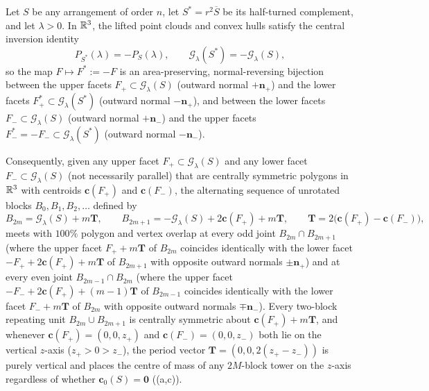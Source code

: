 \begin{theorem}
\label{thm:mirror-tower}
Let $S$ be any arrangement of order $n$, let $S^*=r^2\overline S$ be its half-turned complement, and let $\lambda>0$. In $\mathbb{R}^3$, the lifted point clouds and convex hulls satisfy the central inversion identity
\begin{equation}
\label{eq:central-inv}
P_{S^*}(\lambda) = -P_S(\lambda),\qquad
\mathcal G_\lambda(S^*) = -\mathcal G_\lambda(S),
\end{equation}
so the map $F\mapsto F^*:=-F$ is an area-preserving, normal-reversing bijection between the upper facets $F_+\subset\mathcal G_\lambda(S)$ (outward normal $+\mathbf n_+$) and the lower facets $F_+^*\subset\mathcal G_\lambda(S^*)$ (outward normal $-\mathbf n_+$), and between the lower facets $F_-\subset\mathcal G_\lambda(S)$ (outward normal $+\mathbf n_-$) and the upper facets $F_-^*=-F_-\subset\mathcal G_\lambda(S^*)$ (outward normal $-\mathbf n_-$).

Consequently, given any upper facet $F_+\subset\mathcal G_\lambda(S)$ and any lower facet $F_-\subset\mathcal G_\lambda(S)$ (not necessarily parallel) that are centrally symmetric polygons in $\mathbb{R}^3$ with centroids $\mathbf c(F_+)$ and $\mathbf c(F_-)$, the alternating sequence of unrotated blocks $B_0,B_1,B_2,\dots$ defined by
\begin{equation}
\label{eq:tower-blocks}
B_{2m} = \mathcal G_\lambda(S) + m\mathbf T,\qquad
B_{2m+1} = -\mathcal G_\lambda(S) + 2\mathbf c(F_+) + m\mathbf T,\qquad
\mathbf T = 2\bigl(\mathbf c(F_+) - \mathbf c(F_-)\bigr),
\end{equation}
meets with $100\%$ polygon and vertex overlap at every odd joint $B_{2m}\cap B_{2m+1}$ (where the upper facet $F_+ + m\mathbf T$ of $B_{2m}$ coincides identically with the lower facet $-F_+ + 2\mathbf c(F_+) + m\mathbf T$ of $B_{2m+1}$ with opposite outward normals $\pm\mathbf n_+$) and at every even joint $B_{2m-1}\cap B_{2m}$ (where the upper facet $-F_- + 2\mathbf c(F_+) + (m-1)\mathbf T$ of $B_{2m-1}$ coincides identically with the lower facet $F_- + m\mathbf T$ of $B_{2m}$ with opposite outward normals $\mp\mathbf n_-$). Every two-block repeating unit $B_{2m}\cup B_{2m+1}$ is centrally symmetric about $\mathbf c(F_+)+m\mathbf T$, and whenever $\mathbf c(F_+)=(0,0,z_+)$ and $\mathbf c(F_-)=(0,0,z_-)$ both lie on the vertical $z$-axis ($z_+>0>z_-$), the period vector $\mathbf T=(0,0,2(z_+-z_-))$ is purely vertical and places the centre of mass of any $2M$-block tower on the $z$-axis regardless of whether $\mathbf c_0(S)=\mathbf 0$ ((a,c)).
\end{theorem}

